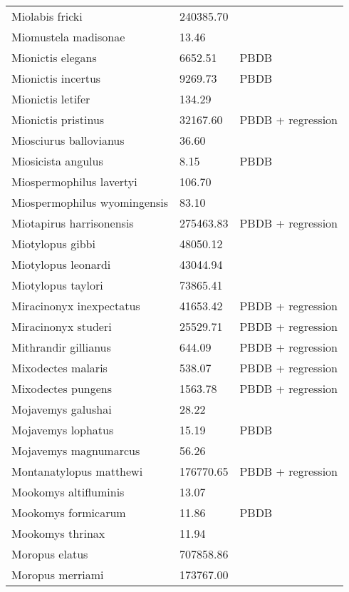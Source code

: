 \documentclass{article}
\begin{document}
\begin{center}
\begin{longtable}{p{} p{} p{}}
    Miolabis fricki & 240385.70 & \cite{Tomiya2013} \\ 
    Miomustela madisonae & 13.46 & \cite{Tomiya2013} \\ 
    Mionictis elegans & 6652.51 & PBDB \\ 
    Mionictis incertus & 9269.73 & PBDB \\ 
    Mionictis letifer & 134.29 & \cite{Tomiya2013} \\ 
    Mionictis pristinus & 32167.60 & PBDB + regression \\ 
    Miosciurus ballovianus & 36.60 & \cite{Tomiya2013} \\ 
    Miosicista angulus & 8.15 & PBDB \\ 
    Miospermophilus lavertyi & 106.70 & \cite{Tomiya2013} \\ 
    Miospermophilus wyomingensis & 83.10 & \cite{Tomiya2013} \\ 
    Miotapirus harrisonensis & 275463.83 & PBDB + regression \\ 
    Miotylopus gibbi & 48050.12 & \cite{Tomiya2013} \\ 
    Miotylopus leonardi & 43044.94 & \cite{Tomiya2013} \\ 
    Miotylopus taylori & 73865.41 & \cite{Tomiya2013} \\ 
    Miracinonyx inexpectatus & 41653.42 & PBDB + regression \\ 
    Miracinonyx studeri & 25529.71 & PBDB + regression \\ 
    Mithrandir gillianus & 644.09 & PBDB + regression \\ 
    Mixodectes malaris & 538.07 & PBDB + regression \\ 
    Mixodectes pungens & 1563.78 & PBDB + regression \\ 
    Mojavemys galushai & 28.22 & \cite{Tomiya2013} \\ 
    Mojavemys lophatus & 15.19 & PBDB \\ 
    Mojavemys magnumarcus & 56.26 & \cite{Tomiya2013} \\ 
    Montanatylopus matthewi & 176770.65 & PBDB + regression \\ 
    Mookomys altifluminis & 13.07 & \cite{Tomiya2013} \\ 
    Mookomys formicarum & 11.86 & PBDB \\ 
    Mookomys thrinax & 11.94 & \cite{Tomiya2013} \\ 
    Moropus elatus & 707858.86 & \cite{Tomiya2013} \\ 
    Moropus merriami & 173767.00 & \cite{McKenna2011} \\ 

\end{longtable}
\end{center}
\end{document}

